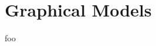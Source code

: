 
\chapter{Graphical Models} \label{sec:gm}




\begin{learningobjectives}
\item foo
\end{learningobjectives}



\begin{exercises}
\begin{Ex}
\TODO

\begin{solution}
\TODO
\end{solution}
\end{Ex}

\end{exercises}
